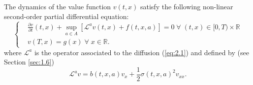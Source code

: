 \begin{theorem}
    The dynamics of the value function $v(t,x)$ satisfy the following non-linear
    second-order partial differential equation:
    \begin{equation}\label{eq:2.19}
        \left\{
        \begin{aligned}
            &\frac{\partial v}{\partial t}(t,x)+\sup_{a\in A}\left[\mathcal{L}^av(t,x)+f(t,x,a)\right]=0\;\forall\;(t,x)\in[0,T)\times\mathbb{R}\\
            &v(T,x)=g(x)\;\forall\;x\in\mathbb{R}.
        \end{aligned}
        \right.
    \end{equation}
    where $\mathcal{L}^a$ is the operator associated to the diffusion (\ref{eq:2.1})
    and defined by (see Section \ref{sec:1.6})
    \begin{equation}
        \mathcal{L}^av=b(t,x,a)v_x+\frac{1}{2}\sigma(t,x,a)^2v_{xx}.
    \end{equation}
\end{theorem}
